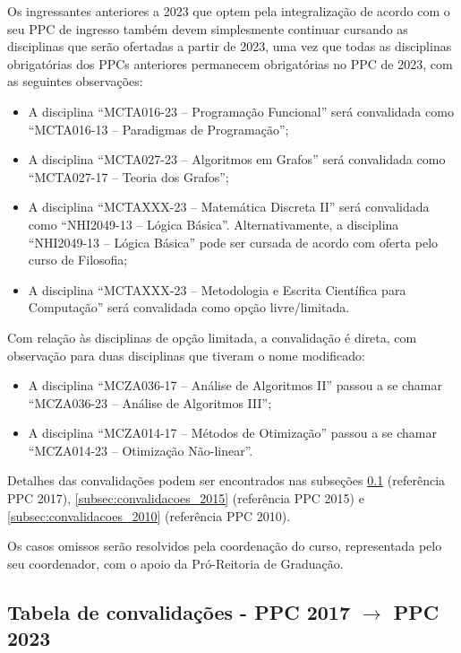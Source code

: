 Os ingressantes anteriores a 2023 que optem pela integralização de acordo com o
seu PPC de ingresso também devem simplesmente continuar cursando as disciplinas
que serão ofertadas a partir de 2023, uma vez que todas as disciplinas
obrigatórias dos PPCs anteriores permanecem obrigatórias no PPC de 2023, com as
seguintes observações:
\begin{itemize}
    \item A disciplina ``MCTA016-23 -- Programação Funcional'' será convalidada
    como ``MCTA016-13 -- Paradigmas de Programação'';
    \item A disciplina ``MCTA027-23 -- Algoritmos em Grafos'' será convalidada
    como ``MCTA027-17 -- Teoria dos Grafos'';
    \item A disciplina ``MCTAXXX-23 -- Matemática Discreta II'' será
    convalidada como ``NHI2049-13 -- Lógica Básica''.  Alternativamente, a
    disciplina ``NHI2049-13 -- Lógica Básica'' pode ser cursada de acordo com
    oferta pelo curso de Filosofia;
    \item A disciplina ``MCTAXXX-23 -- Metodologia e Escrita Científica para
    Computação'' será convalidada como opção livre/limitada.
\end{itemize}
Com relação às disciplinas de opção limitada, a convalidação é direta, com
observação para duas disciplinas que tiveram o nome modificado:
\begin{itemize}
    \item A disciplina ``MCZA036-17 -- Análise de Algoritmos II'' passou a se
    chamar ``MCZA036-23 -- Análise de Algoritmos III'';
    \item A disciplina ``MCZA014-17 -- Métodos de Otimização'' passou a se
    chamar ``MCZA014-23 -- Otimização Não-linear''.
\end{itemize}

Detalhes das convalidações podem ser encontrados nas
subseções \ref{subsec:convalidacoes_2017} (referência PPC 2017), 
\ref{subsec:convalidacoes_2015} (referência PPC 2015) e 
\ref{subsec:convalidacoes_2010} (referência PPC 2010).

Os casos omissos serão resolvidos pela coordenação do curso, representada pelo
seu coordenador, com o apoio da Pró-Reitoria de Graduação.


\newpage

\subsection{Tabela de convalidações - PPC 2017 $\rightarrow$ PPC 2023}
\label{subsec:convalidacoes_2017}

